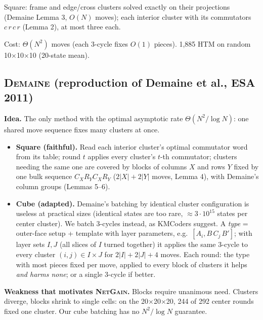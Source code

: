 \documentclass[10.5pt,a4paper]{article}
\newcommand{\Cu}[1]{#1$\times$#1$\times$#1}
\newcommand{\M}[1]{\textsc{#1}}
\begin{document}
Square: frame and edge/cross clusters solved exactly on their projections (Demaine Lemma 3, $O(N)$ moves); each interior cluster
with its commutators $c\,r\,c\,r$ (Lemma 2), at most three each.

Cost: $\Theta(N^2)$ moves (each 3-cycle fixes $O(1)$ pieces). 1,885 HTM on random \Cu{10} (20-state mean).

\subsection{\M{Demaine} (reproduction of Demaine et al., ESA 2011)}
\textbf{Idea.} The only method with the optimal asymptotic rate $\Theta(N^2/\log N)$: one shared move sequence fixes many
clusters at once.
\begin{itemize}
\item \textbf{Square (faithful).} Read each interior cluster's optimal commutator word from its table; round $t$ applies every
cluster's $t$-th commutator; clusters needing the same one are covered by blocks of columns $X$ and rows $Y$ fixed by one bulk
sequence $C_X R_Y C_X R_Y$ ($2|X|+2|Y|$ moves, Lemma 4), with Demaine's column groups (Lemmas 5--6).
\item \textbf{Cube (adapted).} Demaine's batching by identical cluster configuration is useless at practical sizes (identical
states are too rare, $\approx3\cdot10^{15}$ states per center cluster). We batch 3-cycles instead, as KMCoders suggest. A
\emph{type} = outer-face setup + template with layer parameters, e.g.\ $[A_i, B\,C_j\,B']$; with layer sets $I,J$ (all slices of
$I$ turned together) it applies the same 3-cycle to every cluster $(i,j)\in I\times J$ for $2|I|+2|J|+4$ moves. Each round:
the type with most pieces fixed per move, applied to every block of clusters it helps \emph{and harms none}; or a single 3-cycle if
better.
\end{itemize}
\textbf{Weakness that motivates \M{NetGain}.} Blocks require unanimous need. Clusters diverge, blocks shrink to single cells: on the
\Cu{20}, 244 of 292 center rounds fixed one cluster. Our cube batching has no $N^2/\log N$ guarantee.
\end{document}
